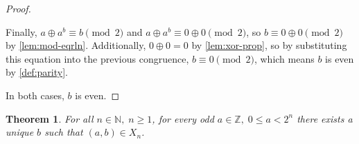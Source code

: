 \documentclass[1gpt]{article}
\theoremstyle{break}
\newtheorem{theorem}{Theorem}[section]
\newcommand{\xor}{\oplus}
\begin{document}
\begin{proof}
\begin{itemize}
            Finally, $a \xor a^b \equiv b \pmod{2}$ and $a \xor a^b \equiv 0
            \xor 0 \pmod{2}$, so $b \equiv 0 \xor 0 \pmod{2}$ by
            \ref{lem:mod-eqrln}. Additionally, $0 \xor 0 = 0$ by
            \ref{lem:xor-prop}, so by substituting this equation into the
            previous congruence, $b \equiv 0 \pmod{2}$, which means $b$ is even
            by \ref{def:parity}.

    \end{itemize}

    In both cases, $b$ is even. \hfill\proofSymbol

\end{proof}

\begin{theorem}
    \label{thm:odd-a}
    For all $n \in \mathbb{N},\; n \geq 1$, for every odd $a \in \mathbb{Z},\;
    0 \leq a < 2^n$ there exists a unique $b$ such that $(a, b) \in X_n$.
\end{theorem}
\end{document}
